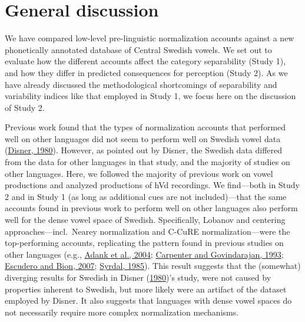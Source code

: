 \documentclass[utf8]{frontiersSCNS}
\begin{document}
\hypertarget{sec:discussion}{%
\section*{General discussion}\label{sec:discussion}}

We have compared low-level pre-linguistic normalization accounts against a new phonetically annotated database of Central Swedish vowels. We set out to evaluate how the different accounts affect the category separability (Study 1), and how they differ in predicted consequences for perception (Study 2). As we have already discussed the methodological shortcomings of separability and variability indices like that employed in Study 1, we focus here on the discussion of Study 2.

Previous work found that the types of normalization accounts that performed well on other languages did not seem to perform well on Swedish vowel data (\protect\hyperlink{ref-disner1980}{Disner, 1980}). However, as pointed out by Disner, the Swedish data differed from the data for other languages in that study, and the majority of studies on other languages. Here, we followed the majority of previous work on vowel productions and analyzed productions of hVd recordings. We find---both in Study 2 and in Study 1 (as long as additional cues are not included)---that the same accounts found in previous work to perform well on other languages also perform well for the dense vowel space of Swedish. Specifically, Lobanov and centering approaches---incl.~Nearey normalization and C-CuRE normalization---were the top-performing accounts, replicating the pattern found in previous studies on other languages (e.g., \protect\hyperlink{ref-adank2004}{Adank et al., 2004}; \protect\hyperlink{ref-carpenter1993}{Carpenter and Govindarajan, 1993}; \protect\hyperlink{ref-escudero2007}{Escudero and Bion, 2007}; \protect\hyperlink{ref-syrda1985}{Syrdal, 1985}). This result suggests that the (somewhat) diverging results for Swedish in Disner (\protect\hyperlink{ref-disner1980}{1980})'s study, were not caused by properties inherent to Swedish, but more likely were an artifact of the dataset employed by Disner. It also suggests that languages with dense vowel spaces do not necessarily require more complex normalization mechanisms.
\end{document}
